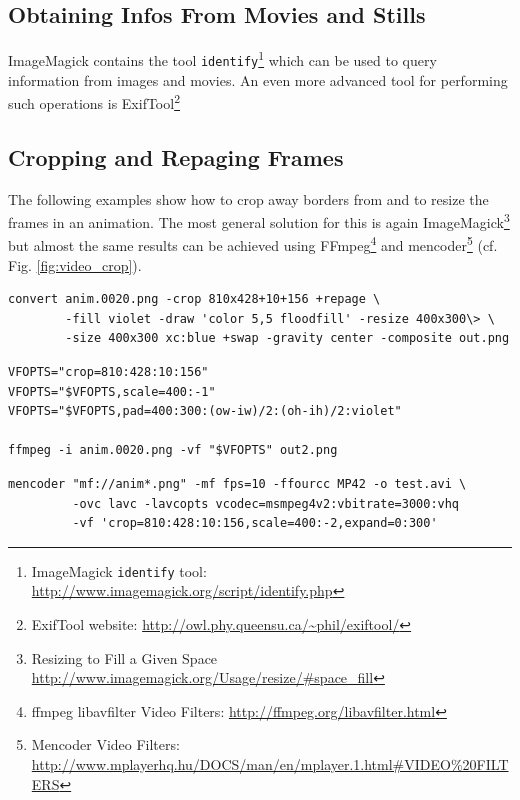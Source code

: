 \inputminted{shell}{sources/batch_renumber_files.txt}

\subsection{Obtaining Infos From Movies and Stills}

ImageMagick    contains   the    tool   \texttt{identify}\footnote{ImageMagick
\texttt{identify}  tool: \url{http://www.imagemagick.org/script/identify.php}}
which can  be used to query information  from images and movies.  An even more
advanced  tool for  performing such  operations  is ExifTool\footnote{ExifTool
website: \url{http://owl.phy.queensu.ca/~phil/exiftool/}}

\subsection{Cropping and Repaging Frames}

The following  examples show how to crop  away borders from and  to resize the
frames  in  an  animation.   The  most  general solution  for  this  is  again
ImageMagick\footnote{Resizing       to      Fill      a       Given      Space
\url{http://www.imagemagick.org/Usage/resize/\#space_fill}}   but  almost  the
same results  can be  achieved using FFmpeg\footnote{ffmpeg  libavfilter Video
Filters:             \url{http://ffmpeg.org/libavfilter.html}}             and
mencoder\footnote{Mencoder                    Video                   Filters:
\url{http://www.mplayerhq.hu/DOCS/man/en/mplayer.1.html\#VIDEO\%20FILTERS}}
(cf. Fig. \ref{fig:video_crop}).

\begin{verbatim}
convert anim.0020.png -crop 810x428+10+156 +repage \
        -fill violet -draw 'color 5,5 floodfill' -resize 400x300\> \
        -size 400x300 xc:blue +swap -gravity center -composite out.png
\end{verbatim}

\begin{verbatim}
VFOPTS="crop=810:428:10:156"
VFOPTS="$VFOPTS,scale=400:-1"
VFOPTS="$VFOPTS,pad=400:300:(ow-iw)/2:(oh-ih)/2:violet"

ffmpeg -i anim.0020.png -vf "$VFOPTS" out2.png
\end{verbatim}

\begin{verbatim}
mencoder "mf://anim*.png" -mf fps=10 -ffourcc MP42 -o test.avi \
         -ovc lavc -lavcopts vcodec=msmpeg4v2:vbitrate=3000:vhq 
         -vf 'crop=810:428:10:156,scale=400:-2,expand=0:300'
\end{verbatim}

